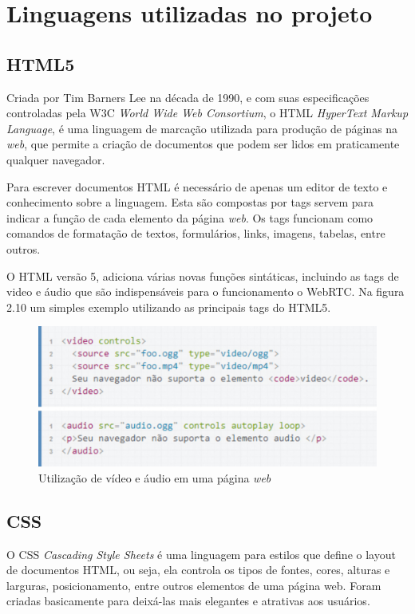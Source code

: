 \documentclass[12pt,a4paper,oneside]{report}
\begin{document}
\section{Linguagens utilizadas no projeto}
\label{s_linguagensProjeto}

\subsection{HTML5}
\label{ss_html5}
Criada por Tim Barners Lee na década de 1990, e com suas especificações controladas pela W3C \textit{World Wide Web Consortium}, o HTML \textit{HyperText Markup Language}, é uma linguagem  de marcação utilizada para produção de páginas na \textit{web}, que permite a criação de documentos que podem ser lidos em praticamente qualquer navegador.

Para escrever documentos HTML é necessário de apenas um editor de texto e conhecimento sobre a linguagem. Esta são compostas por tags servem para indicar a função de cada elemento da página \textit{web}. Os tags funcionam como comandos de formatação de textos, formulários, links, imagens, tabelas, entre outros.

O HTML versão 5, adiciona várias novas funções sintáticas, incluindo as tags de video e áudio que são indispensáveis para o funcionamento o WebRTC. Na figura 2.10 um simples exemplo utilizando as principais tags do HTML5.

\begin{figure}[!htdb]
 \centering
  \includegraphics[width = 1\linewidth]{images/html5}
  \caption{Utilização de vídeo e áudio em uma página \textit{web}} %
  \label{f_mediaStream}
\end{figure}

\subsection{CSS}
\label{ss_css}
O CSS \textit{Cascading Style Sheets} é uma linguagem para estilos que define o layout de documentos HTML, ou seja, ela controla os tipos de  fontes, cores, alturas e larguras, posicionamento, entre outros elementos de uma página web. Foram criadas basicamente para deixá-las mais elegantes e atrativas aos usuários.
\end{document}

